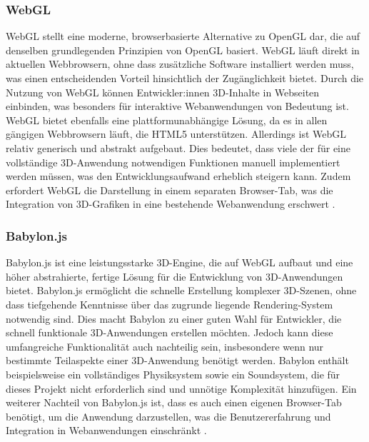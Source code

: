 \subsubsection{WebGL}
WebGL stellt eine moderne, browserbasierte Alternative zu OpenGL dar, die auf denselben grundlegenden Prinzipien von OpenGL basiert.
WebGL läuft direkt in aktuellen Webbrowsern, ohne dass zusätzliche Software installiert werden muss, was einen entscheidenden Vorteil hinsichtlich der Zugänglichkeit bietet.
Durch die Nutzung von WebGL können Entwickler:innen 3D-Inhalte in Webseiten einbinden, was besonders für interaktive Webanwendungen von Bedeutung ist.
WebGL bietet ebenfalls eine plattformunabhängige Lösung, da es in allen gängigen Webbrowsern läuft, die HTML5 unterstützen. Allerdings ist WebGL relativ generisch und abstrakt aufgebaut.
Dies bedeutet, dass viele der für eine vollständige 3D-Anwendung notwendigen Funktionen manuell implementiert werden müssen, was den Entwicklungsaufwand
erheblich steigern kann. Zudem erfordert WebGL die Darstellung in einem separaten Browser-Tab,
was die Integration von 3D-Grafiken in eine bestehende Webanwendung erschwert .

\subsubsection{Babylon.js}
Babylon.js ist eine leistungsstarke 3D-Engine, die auf WebGL aufbaut und eine höher abstrahierte, fertige Lösung für die Entwicklung von 3D-Anwendungen bietet.
Babylon.js ermöglicht die schnelle Erstellung komplexer 3D-Szenen, ohne dass tiefgehende Kenntnisse über das zugrunde liegende Rendering-System notwendig sind.
Dies macht Babylon zu einer guten Wahl für Entwickler, die schnell funktionale 3D-Anwendungen erstellen möchten.
Jedoch kann diese umfangreiche Funktionalität auch nachteilig sein, insbesondere wenn nur bestimmte Teilaspekte einer 3D-Anwendung benötigt werden.
Babylon enthält beispielsweise ein vollständiges Physiksystem sowie ein Soundsystem, die für dieses Projekt nicht erforderlich sind und unnötige Komplexität hinzufügen.
Ein weiterer Nachteil von Babylon.js ist, dass es auch einen eigenen Browser-Tab benötigt,
um die Anwendung darzustellen,
was die Benutzererfahrung und Integration in Webanwendungen einschränkt .

